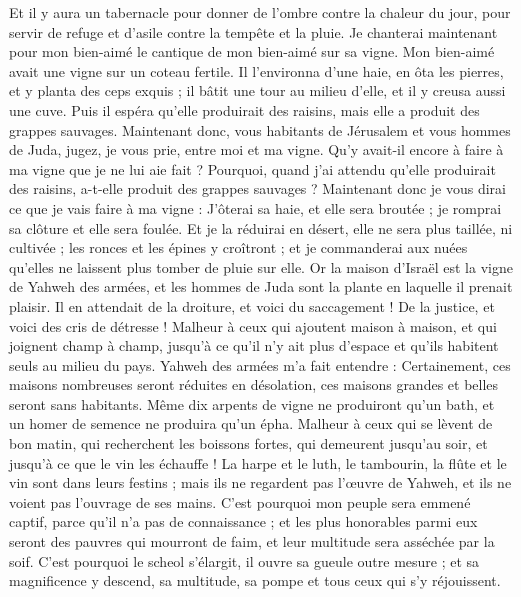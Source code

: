 \begin{multicols}{2}
Et il y aura un tabernacle pour donner de l'ombre contre la chaleur du jour, pour servir de refuge et d'asile contre la tempête et la pluie.
\VerseOne{}Je chanterai maintenant pour mon bien-aimé le cantique de mon bien-aimé sur sa vigne. Mon bien-aimé avait une vigne sur un coteau fertile.
Il l'environna d'une haie, en ôta les pierres, et y planta des ceps exquis ; il bâtit une tour au milieu d'elle, et il y creusa aussi une cuve. Puis il espéra qu'elle produirait des raisins, mais elle a produit des grappes sauvages.
Maintenant donc, vous habitants de Jérusalem et vous hommes de Juda, jugez, je vous prie, entre moi et ma vigne.
Qu'y avait-il encore à faire à ma vigne que je ne lui aie fait ? Pourquoi, quand j'ai attendu qu'elle produirait des raisins, a-t-elle produit des grappes sauvages ?
Maintenant donc je vous dirai ce que je vais faire à ma vigne : J'ôterai sa haie, et elle sera broutée ; je romprai sa clôture et elle sera foulée.
Et je la réduirai en désert, elle ne sera plus taillée, ni cultivée ; les ronces et les épines y croîtront ; et je commanderai aux nuées qu'elles ne laissent plus tomber de pluie sur elle.
Or la maison d'Israël est la vigne de Yahweh des armées, et les hommes de Juda sont la plante en laquelle il prenait plaisir. Il en attendait de la droiture, et voici du saccagement ! De la justice, et voici des cris de détresse !
Malheur à ceux qui ajoutent maison à maison, et qui joignent champ à champ, jusqu'à ce qu'il n'y ait plus d'espace et qu'ils habitent seuls au milieu du pays.
Yahweh des armées m'a fait entendre : Certainement, ces maisons nombreuses seront réduites en désolation, ces maisons grandes et belles seront sans habitants.
Même dix arpents de vigne ne produiront qu'un bath, et un homer de semence ne produira qu'un épha.
Malheur à ceux qui se lèvent de bon matin, qui recherchent les boissons fortes, qui demeurent jusqu'au soir, et jusqu'à ce que le vin les échauffe !
La harpe et le luth, le tambourin, la flûte et le vin sont dans leurs festins ; mais ils ne regardent pas l'œuvre de Yahweh, et ils ne voient pas l'ouvrage de ses mains.
C'est pourquoi mon peuple sera emmené captif, parce qu'il n'a pas de connaissance ; et les plus honorables parmi eux seront des pauvres qui mourront de faim, et leur multitude sera asséchée par la soif.
C'est pourquoi le scheol s'élargit, il ouvre sa gueule outre mesure ; et sa magnificence y descend, sa multitude, sa pompe et tous ceux qui s'y réjouissent.

\end{multicols}
